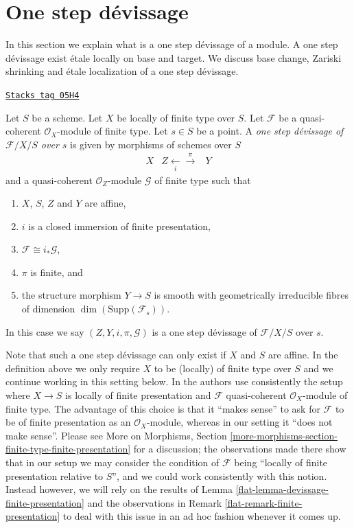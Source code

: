 \section{One step d\'evissage}
\label{flat-section-one-step-devissage}
In this section we explain what is a one step d\'evissage of a
module. A one step d\'evissage exist \'etale locally on base and target.
We discuss base change, Zariski shrinking and \'etale localization of
a one step d\'evissage.

\begin{definition}
\label{flat-definition-one-step-devissage}
\href{https://stacks.math.columbia.edu/tag/05H4}{\texttt{Stacks tag 05H4}}

Let $S$ be a scheme.
Let $X$ be locally of finite type over $S$.
Let $\mathcal{F}$ be a quasi-coherent $\mathcal{O}_X$-module of finite type.
Let $s \in S$ be a point.
A {\it one step d\'evissage of $\mathcal{F}/X/S$ over $s$}
is given by morphisms of schemes over $S$
$$
\begin{array}{ccc}X & Z \underset{i}{\longleftarrow}\overset{\pi}{\longrightarrow} & Y\end{array}
$$
and a quasi-coherent $\mathcal{O}_Z$-module $\mathcal{G}$ of finite type
such that
\begin{enumerate}
\item $X$, $S$, $Z$ and $Y$ are affine,
\item $i$ is a closed immersion of finite presentation,
\item $\mathcal{F} \cong i_*\mathcal{G}$,
\item $\pi$ is finite, and
\item the structure morphism $Y \to S$ is smooth with
geometrically irreducible fibres of
dimension $\dim(\text{Supp}(\mathcal{F}_s))$.
\end{enumerate}
In this case we say $(Z, Y, i, \pi, \mathcal{G})$ is a one step
d\'evissage of $\mathcal{F}/X/S$ over $s$.
\end{definition}

Note that such a one step d\'evissage can only exist if $X$ and $S$
are affine. In the definition above we only require $X$ to be
(locally) of finite type over $S$ and we continue working in this
setting below. In \cite{GruRay} the authors use consistently the setup
where $X \to S$ is locally of finite presentation and $\mathcal{F}$
quasi-coherent $\mathcal{O}_X$-module of finite type. The advantage
of this choice is that it ``makes sense'' to ask for $\mathcal{F}$ to
be of finite presentation as an $\mathcal{O}_X$-module, whereas in our
setting it ``does not make sense''. Please see
More on Morphisms, Section
\ref{more-morphisms-section-finite-type-finite-presentation}
for a discussion; the observations made there show that in our setup
we may consider the condition of $\mathcal{F}$ being ``locally of finite
presentation relative to $S$'', and we could work consistently with this
notion. Instead however, we will rely on the results of
Lemma \ref{flat-lemma-devissage-finite-presentation}
and the observations in
Remark \ref{flat-remark-finite-presentation}
to deal with this issue in an ad hoc fashion whenever it comes up.


